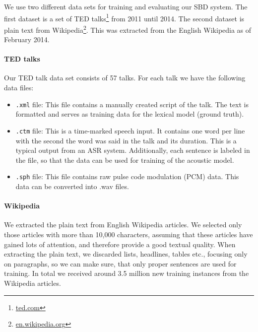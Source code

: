 We use two different data sets for training and evaluating our SBD system.
The first dataset is a set of TED talks\footnote{\url{ted.com}} from 2011 until 2014.
The second dataset is plain text from Wikipedia\footnote{\url{en.wikipedia.org}}.
This was extracted from the English Wikipedia as of February 2014.

\paragraph{TED talks}
Our TED talk data set consists of 57 talks. For each talk we have the following data files:
\begin{itemize}
	\item \texttt{.xml} file: This file contains a manually created script of the talk.
	The text is formatted and serves as training data for the lexical model (ground truth).
	\item \texttt{.ctm} file: This is a time-marked speech input.
	It contains one word per line with the second the word was said in the talk and its duration.
    This is a typical output from an ASR system.
	Additionally, each sentence is labeled in the file, so that the data can be used for training of the acoustic model.
	\item \texttt{.sph} file: This file contains raw pulse code modulation (PCM) data.
	This data can be converted into .wav files.
\end{itemize}

\paragraph{Wikipedia}
We extracted the plain text from English Wikipedia articles.
We selected only those articles with more than 10,000 characters, assuming that these articles have gained lots of attention, and therefore provide a good textual quality.
When extracting the plain text, we discarded lists, headlines, tables etc., focusing only on paragraphs, so we can make sure, that only proper sentences are used for training.
In total we received around 3.5 million new training instances from the Wikipedia articles.